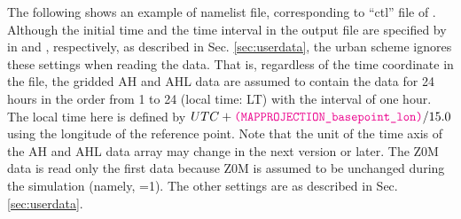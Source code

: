 The following shows an example of namelist file, corresponding to ``ctl'' file of \grads.
%
Although the initial time and the time interval in the output file are specified by  in  and , respectively, as described in Sec. \ref{sec:userdata},
the urban scheme ignores these settings when reading the data.
That is, regardless of the time coordinate in the \scalenetcdf file,
the gridded AH and AHL data are assumed to contain the data for 24 hours in the order from 1 to 24 (local time: LT) with the interval of one hour.
The local time here is defined by $UTC + \nmitem{MAPPROJECTION_basepoint_lon}/15.0$ using the longitude of the reference point.
Note that the unit of the time axis of the AH and AHL data array may change in the next version or later.
The Z0M data is read only the first data because Z0M is assumed to be unchanged during the simulation (namely, =1).
The other settings are as described in Sec. \ref{sec:userdata}.
